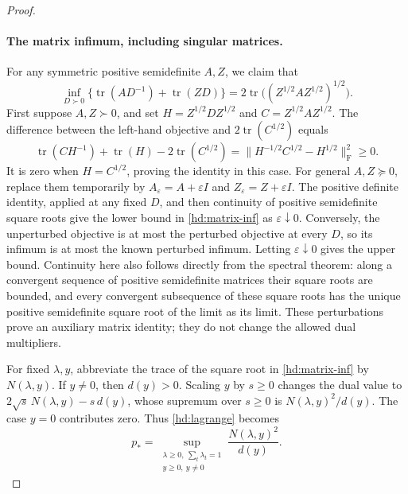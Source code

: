 \begin{proof}
\paragraph{The matrix infimum, including singular matrices.}
For any symmetric positive semidefinite $A,Z$, we claim that
\begin{equation}
\label{hd:matrix-inf}
 \inf_{D\succ0}
 \bigl\{\operatorname{tr}(AD^{-1})+\operatorname{tr}(ZD)\bigr\}
 =2\operatorname{tr}\bigl((Z^{1/2}AZ^{1/2})^{1/2}\bigr).
\end{equation}
First suppose $A,Z\succ0$, and set
$H=Z^{1/2}DZ^{1/2}$ and $C=Z^{1/2}AZ^{1/2}$.  The difference between
the left-hand objective and $2\operatorname{tr}(C^{1/2})$ equals
\[
 \operatorname{tr}(CH^{-1})+\operatorname{tr}(H)
       -2\operatorname{tr}(C^{1/2})
   =\|H^{-1/2}C^{1/2}-H^{1/2}\|_{\mathrm F}^2\geq0.
\]
It is zero when $H=C^{1/2}$, proving the identity in this case.
For general $A,Z\succeq0$, replace them temporarily by
$A_\varepsilon=A+\varepsilon I$ and
$Z_\varepsilon=Z+\varepsilon I$.  The positive definite identity,
applied at any fixed $D$, and then continuity of positive semidefinite
square roots give the lower bound in \eqref{hd:matrix-inf} as
$\varepsilon\downarrow0$.  Conversely, the unperturbed objective is
at most the perturbed objective at every $D$, so its infimum is at
most the known perturbed infimum.  Letting $\varepsilon\downarrow0$
gives the upper bound.  Continuity here also follows directly from the
spectral theorem: along a convergent sequence of positive semidefinite
matrices their square roots are bounded, and every convergent
subsequence of these square roots has the unique positive
semidefinite square root of the limit as its limit.  These
perturbations prove an auxiliary matrix identity; they do not change
the allowed dual multipliers.

For fixed $\lambda,y$, abbreviate the trace of the square root in
\eqref{hd:matrix-inf} by $N(\lambda,y)$.  If $y\ne0$, then $d(y)>0$.
Scaling $y$ by $s\geq0$ changes the dual value to
$2\sqrt{s}\,N(\lambda,y)-s\,d(y)$, whose supremum over $s\geq0$ is
$N(\lambda,y)^2/d(y)$.  The case $y=0$ contributes zero.  Thus
\eqref{hd:lagrange} becomes
\begin{equation}
\label{hd:homogeneous}
 p_*=
 \sup_{\substack{\lambda\geq0,\ \sum_t\lambda_t=1\\y\geq0,\ y\ne0}}
 \frac{N(\lambda,y)^2}{d(y)}.
\end{equation}


\end{proof}
